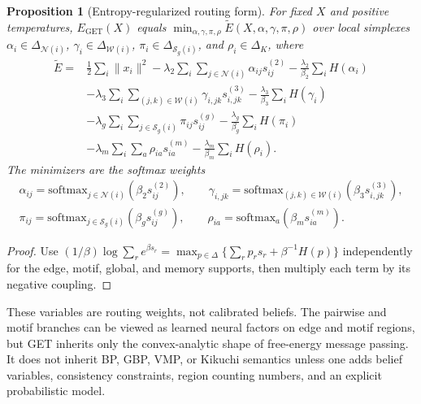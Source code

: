 \documentclass[11pt,a4paper]{article}
\newtheorem{proposition}{Proposition}
\begin{document}
\begin{proposition}[Entropy-regularized routing form]
\label{prop:routing}
For fixed $X$ and positive temperatures, $E_{\mathrm{GET}}(X)$ equals
$\min_{\alpha,\gamma,\pi,\rho}\widetilde E(X,\alpha,\gamma,\pi,\rho)$ over
local simplexes
$\alpha_i\in\Delta_{\mathcal N(i)}$,
$\gamma_i\in\Delta_{\mathcal W(i)}$,
$\pi_i\in\Delta_{\mathcal S_g(i)}$, and
$\rho_i\in\Delta_K$, where
\begin{equation}
\begin{aligned}
\widetilde E
={}& \frac12\sum_i\|x_i\|^2
-\lambda_2\sum_i\sum_{j\in\mathcal N(i)}\alpha_{ij}s^{(2)}_{ij}
-\frac{\lambda_2}{\beta_2}\sum_i H(\alpha_i)\\
&-\lambda_3\sum_i\sum_{(j,k)\in\mathcal W(i)}
  \gamma_{i,jk}s^{(3)}_{i,jk}
-\frac{\lambda_3}{\beta_3}\sum_i H(\gamma_i)\\
&-\lambda_g\sum_i\sum_{j\in\mathcal S_g(i)}\pi_{ij}s^{(g)}_{ij}
-\frac{\lambda_g}{\beta_g}\sum_i H(\pi_i)\\
&-\lambda_m\sum_i\sum_a\rho_{ia}s^{(m)}_{ia}
-\frac{\lambda_m}{\beta_m}\sum_i H(\rho_i).
\end{aligned}
\label{eq:lifted-energy}
\end{equation}
The minimizers are the softmax weights
\begin{equation}
\begin{aligned}
  \alpha_{ij}=\mathrm{softmax}_{j\in\mathcal N(i)}(\beta_2s^{(2)}_{ij}),
  \qquad
  \gamma_{i,jk}=\mathrm{softmax}_{(j,k)\in\mathcal W(i)}
    (\beta_3s^{(3)}_{i,jk}),\\
  \pi_{ij}=\mathrm{softmax}_{j\in\mathcal S_g(i)}(\beta_gs^{(g)}_{ij}),
  \qquad
  \rho_{ia}=\mathrm{softmax}_{a}(\beta_ms^{(m)}_{ia}).
\end{aligned}
\end{equation}
\end{proposition}

\begin{proof}
Use
$(1/\beta)\log\sum_r e^{\beta s_r}
=\max_{p\in\Delta}\{\sum_r p_rs_r+\beta^{-1}H(p)\}$ independently for the
edge, motif, global, and memory supports, then multiply each term by its
negative coupling.
\end{proof}

These variables are routing weights, not calibrated beliefs. The pairwise and
motif branches can be viewed as learned neural factors on edge and motif
regions, but GET inherits only the convex-analytic shape of free-energy message
passing. It does not inherit BP, GBP, VMP, or Kikuchi semantics unless one adds
belief variables, consistency constraints, region counting numbers, and an
explicit probabilistic model.
\end{document}
